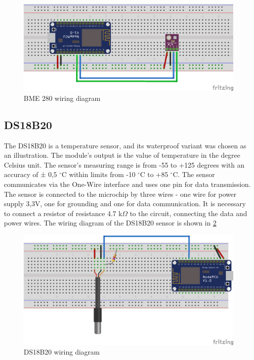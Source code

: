 \begin{figure}[H]
	\centering
	\includegraphics[width=\textwidth]{img/bme280_schema.png}
	\caption{BME 280 wiring diagram}
	\label{fig:bme280_schema}
\end{figure}


\subsection{DS18B20}

The DS18B20 \citep{DS18B20:Datasheet} is a temperature sensor, and its waterproof variant was chosen as an illustration.  The module's output is the value of temperature in the degree Celsius unit. The sensor's measuring range is from -55 to +125 degrees with an accuracy of ± 0,5 $^{\circ}$C within limits from -10 $^{\circ}$C to +85 $^{\circ}$C. The sensor communicates via the One-Wire interface and uses one pin for data transmission. The sensor is connected to the microchip by three wires - one wire for power supply 3,3V, one for grounding and one for data communication. It is necessary to connect a resistor of resistance 4.7 k$\Omega$ to the circuit, connecting the data and power wires. The wiring diagram of the DS18B20 sensor is shown in \cref{fig:ds18b20_schema}

\begin{figure}[H]
	\centering
	\includegraphics[width=\textwidth]{img/ds18b20_schema.png}
	\caption{DS18B20 wiring diagram}
	\label{fig:ds18b20_schema}
\end{figure}


